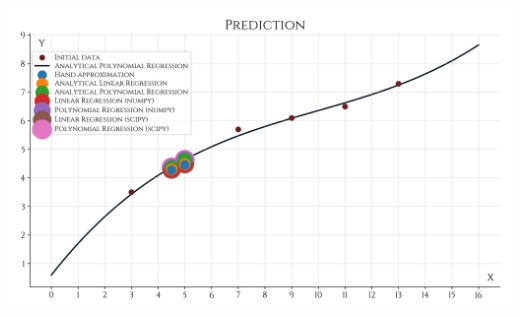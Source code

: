 \documentclass[a4paper, 14pt]{extarticle}
\begin{document}
\begin{center}
    \includegraphics[width=1\textwidth, height=1\textheight, keepaspectratio]{Prediction_Plot} \\
\end{center}
\end{document}
